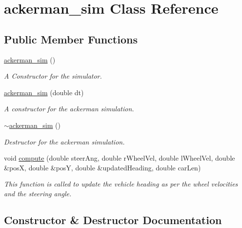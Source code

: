 \hypertarget{classackerman__sim}{}\section{ackerman\+\_\+sim Class Reference}
\label{classackerman__sim}
\subsection*{Public Member Functions}
\begin{DoxyCompactItemize}
\item 
\hyperlink{classackerman__sim_adc6ee573b9cfc562f439ee0d9ad75121}{ackerman\+\_\+sim} ()
\begin{DoxyCompactList}\small\item\em A Constructor for the simulator. \end{DoxyCompactList}\item 
\hyperlink{classackerman__sim_a74a90d213df76c3fe4f8c1f29fa3b668}{ackerman\+\_\+sim} (double dt)
\begin{DoxyCompactList}\small\item\em A constructor for the ackerman simulation. \end{DoxyCompactList}\item 
\hyperlink{classackerman__sim_a142ee1c5be5f84b1ba94091be817ce65}{$\sim$ackerman\+\_\+sim} ()
\begin{DoxyCompactList}\small\item\em Destructor for the ackerman simulation. \end{DoxyCompactList}\item 
void \hyperlink{classackerman__sim_a942b5493103ae31ab1a0c6868a0f2de8}{compute} (double steer\+Ang, double r\+Wheel\+Vel, double l\+Wheel\+Vel, double \&posX, double \&posY, double \&updated\+Heading, double car\+Len)
\begin{DoxyCompactList}\small\item\em This function is called to update the vehicle heading as per the wheel velocities and the steering angle. \end{DoxyCompactList}\end{DoxyCompactItemize}


\subsection{Constructor \& Destructor Documentation}
